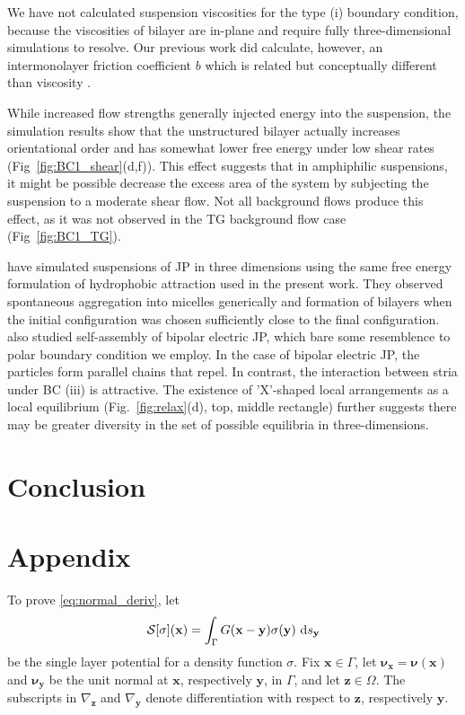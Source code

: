 \documentclass[prb,preprint,showpacs,preprintnumbers,amsmath,amssymb,longbibliography]{revtex4-1}
\newcommand{\nnu}{\boldsymbol{\nu}}
\newcommand{\xx}{\mathbf{x}}
\newcommand{\zz}{\mathbf{z}}
\newcommand{\yy}{\mathbf{y}}
\begin{document}
We have not calculated suspension viscosities for the type (i) boundary condition,
because the viscosities of bilayer are in-plane and require fully three-dimensional
simulations to resolve.  Our previous work 
did calculate, however, an intermonolayer friction coefficient $b$
which is related but conceptually different than viscosity \cite{Fu2022_JFM}.

While increased flow strengths generally injected energy into the suspension,
the simulation results show that the unstructured bilayer 
actually increases orientational order and has somewhat lower free energy 
under low shear rates (Fig~\ref{fig:BC1_shear}(d,f)).
This effect suggests that in amphiphilic suspensions,
it might be possible decrease the excess area of the system 
by subjecting the suspension to a moderate shear flow.
Not all background flows produce this effect, as it was not
observed in the TG background flow case (Fig~\ref{fig:BC1_TG}).

\citet{kohl-cor-che-vee22} have simulated
suspensions of JP in three dimensions
using the same free energy formulation of
hydrophobic attraction used in the
present work. They observed spontaneous
aggregation into micelles generically and
formation of bilayers when the initial
configuration was chosen sufficiently close to the final
configuration.
\citet{kohl-cor-che-vee22} also studied self-assembly
of bipolar electric JP, which bare some resemblence
to polar boundary condition we employ.
In the case of bipolar electric JP, the particles
form parallel chains that repel.  In contrast, the
interaction between stria under BC (iii) is attractive.
The existence of 'X'-shaped local arrangements as a local
equilibrium (Fig.~\ref{fig:relax}(d), top, middle rectangle)
further suggests there may be greater diversity in the set of
possible equilibria in three-dimensions.

\section{Conclusion}
\label{sec:conclusion}

\section{Appendix}
\label{sec:appendix}
To prove \eqref{eq:normal_deriv}, let 
\begin{equation}
  \label{eq:SLP}
  \mathcal{S}[\sigma](\xx) = \int_\Gamma G(\xx-\yy) \sigma(\yy)\, \dif s_\yy
\end{equation}
be the single layer potential for a density function $\sigma.$
Fix $\xx \in \Gamma$,
let $\nnu_{\xx} = \nnu(\xx)$ and $\nnu_{\yy}$ be the unit normal at $\xx$, respectively $\yy$, in $\Gamma$,
and let $\zz \in \Omega$.  The subscripts in $\nabla_{\zz}$ and $\nabla_{\yy}$ denote
differentiation with respect to $\zz$, respectively $\yy$.
\end{document}
